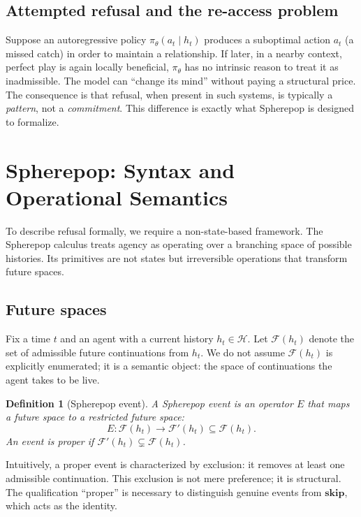 \documentclass[11pt]{article}
\newtheorem{definition}{Definition}
\newcommand{\Hist}{\mathcal{H}}
\newcommand{\Future}{\mathcal{F}}
\begin{document}
\subsection{Attempted refusal and the re-access problem}

Suppose an autoregressive policy $\pi_\theta(a_t \mid h_t)$ produces a
suboptimal action $a_t$ (a missed catch) in order to maintain a relationship.
If later, in a nearby context, perfect play is again locally beneficial,
$\pi_\theta$ has no intrinsic reason to treat it as inadmissible. The model can
``change its mind'' without paying a structural price. The consequence is that
refusal, when present in such systems, is typically a \emph{pattern}, not a
\emph{commitment}. This difference is exactly what Spherepop is designed to
formalize.

\section{Spherepop: Syntax and Operational Semantics}
\label{sec:spherepop}

To describe refusal formally, we require a non-state-based framework. The
Spherepop calculus treats agency as operating over a branching space of possible
histories. Its primitives are not states but irreversible operations that
transform future spaces.

\subsection{Future spaces}

Fix a time $t$ and an agent with a current history $h_t \in \Hist$. Let
$\Future(h_t)$ denote the set of admissible future continuations from $h_t$.
We do not assume $\Future(h_t)$ is explicitly enumerated; it is a semantic
object: the space of continuations the agent takes to be live.

\begin{definition}[Spherepop event]
A Spherepop event is an operator $E$ that maps a future space to a restricted
future space:
\[
E:\Future(h_t)\to \Future'(h_t) \subseteq \Future(h_t).
\]
An event is \emph{proper} if $\Future'(h_t)\subsetneq \Future(h_t)$.
\end{definition}

Intuitively, a proper event is characterized by exclusion: it removes at least
one admissible continuation. This exclusion is not mere preference; it is
structural. The qualification ``proper'' is necessary to distinguish genuine
events from $\mathbf{skip}$, which acts as the identity.
\end{document}
